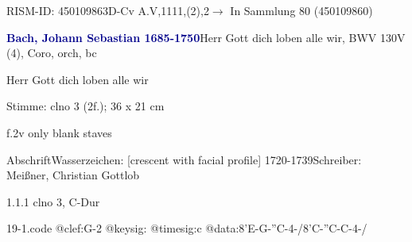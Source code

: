 \documentclass[a4paper, twocolumn, 11pt]{book}
\begin{document}
\newline %
\par RISM-ID: 450109863\newline D-Cv  A.V,1111,(2),2\newline $\rightarrow$ In Sammlung 80 (450109860)
      
\par \vspace{16pt} \textcolor{darkblue}{\textbf{Bach, Johann Sebastian  1685-1750}}\hfillplus{[19]}\newline Herr Gott dich loben alle wir, BWV 130\newline V (4), Coro, orch, bc
\par \begin{itshape} Herr Gott dich loben alle wir\end{itshape} 
\par \textcolor{darkblue}{}  Stimme: clno 3  (2f.); 36 x 21 cm\newline \begin{small} f.2v only blank staves\end{small} \newline Abschrift\newline Wasserzeichen: [crescent with facial profile]  1720-1739\newline Schreiber: Meißner, Christian Gottlob
\par 1.1.1  clno 3, C-Dur  
\begin{filecontents*}{19-1.code}
@clef:G-2
@keysig:
@timesig:c
@data:8'E-G-''C-4-/8'C-''C-C-4-/
\end{filecontents*}
\end{document}
